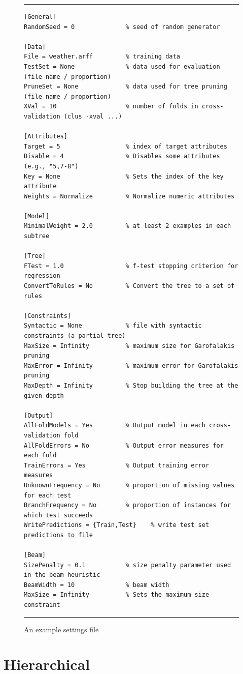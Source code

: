 \documentclass[a4paper]{report}
\begin{document}
\begin{figure}[tb]
\hrule\vspace{1em}
\begin{verbatim}
[General]
RandomSeed = 0              % seed of random generator

[Data]
File = weather.arff         % training data
TestSet = None              % data used for evaluation (file name / proportion)
PruneSet = None             % data used for tree pruning (file name / proportion)
XVal = 10                   % number of folds in cross-validation (clus -xval ...)

[Attributes]
Target = 5                  % index of target attributes
Disable = 4                 % Disables some attributes (e.g., "5,7-8")
Key = None                  % Sets the index of the key attribute
Weights = Normalize         % Normalize numeric attributes

[Model]
MinimalWeight = 2.0         % at least 2 examples in each subtree
         
[Tree]
FTest = 1.0                 % f-test stopping criterion for regression
ConvertToRules = No         % Convert the tree to a set of rules

[Constraints]
Syntactic = None            % file with syntactic constraints (a partial tree)
MaxSize = Infinity          % maximum size for Garofalakis pruning
MaxError = Infinity         % maximum error for Garofalakis pruning
MaxDepth = Infinity         % Stop building the tree at the given depth

[Output]
AllFoldModels = Yes         % Output model in each cross-validation fold
AllFoldErrors = No          % Output error measures for each fold
TrainErrors = Yes           % Output training error measures
UnknownFrequency = No       % proportion of missing values for each test
BranchFrequency = No        % proportion of instances for which test succeeds
WritePredictions = {Train,Test}    % write test set predictions to file

[Beam]
SizePenalty = 0.1           % size penalty parameter used in the beam heuristic
BeamWidth = 10              % beam width
MaxSize = Infinity          % Sets the maximum size constraint
\end{verbatim}
\hrule
\caption{An example settings file}
\label{settings:fig}
\end{figure}

%
\section{Hierarchical}
\end{document}
